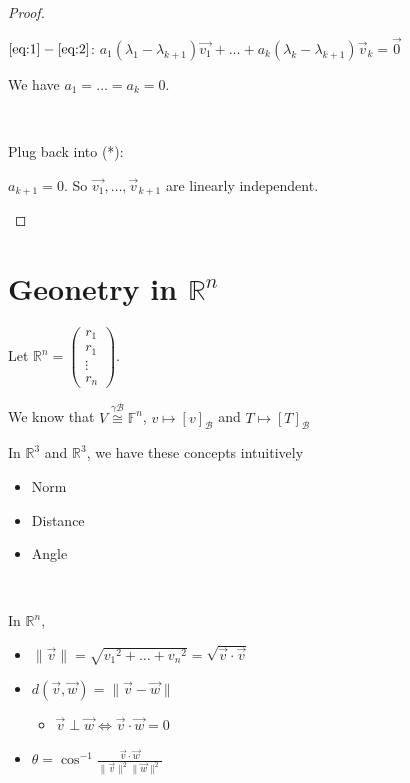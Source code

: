 \documentclass[11pt,fleqn]{book} %
\begin{document}
\begin{proof}
\begin{itemize}
    $\ref{eq:1} - \ref{eq:2}$: 
    $a_1(\lambda_1 - \lambda_{k+1})\overrightarrow{v_1} + \dots + a_k(\lambda_k-\lambda_{k+1})\overrightarrow{v}_k = \overrightarrow{0}$

    We have $a_1 = \dots = a_k = 0$. 
    
    {~~~}

    Plug back into (*): 

    $a_{k+1} = 0$. So $\overrightarrow{v_1}, \dots, \overrightarrow{v}_{k+1}$ are linearly independent. 
    \end{itemize}
\end{proof}

\section{Geonetry in $\mathbb{R}^n$}

Let $\mathbb{R}^n = \begin{pmatrix} r_1 \\ r_1 \\ \vdots \\ r_n \end{pmatrix}$. 

\noindent We know that $V \overset{\gamma\mathcal{B}}{\cong} \mathbb{F}^n$, $v \mapsto [v]_\mathcal{B}$ and $T \mapsto [T]_\mathcal{B}$

\noindent In $\mathbb{R}^3$ and $\mathbb{R}^3$, we have these concepts intuitively
\begin{itemize}
    \item Norm
    \item Distance
    \item Angle
\end{itemize}

{~~~}

\noindent In $\mathbb{R}^n$, 
\begin{itemize}
    \item $\|\overrightarrow{v}\| = \sqrt{{v_1}^2 + \dots + {v_n}^2} = \sqrt{\overrightarrow{v} \cdot \overrightarrow{v}}$
    \item $d(\overrightarrow{v}, \overrightarrow{w}) = \|\overrightarrow{v} - \overrightarrow{w}\|$
    \begin{itemize}
        \item $\overrightarrow{v} \perp \overrightarrow{w} \iff \overrightarrow{v} \cdot \overrightarrow{w} = 0$
    \end{itemize}
    \item $\theta = \cos^{-1}\frac{\overrightarrow{v} \cdot \overrightarrow{w}}{\|\overrightarrow{v}\|^2 \|\overrightarrow{w}\|^2}$
\end{itemize}
\end{document}
